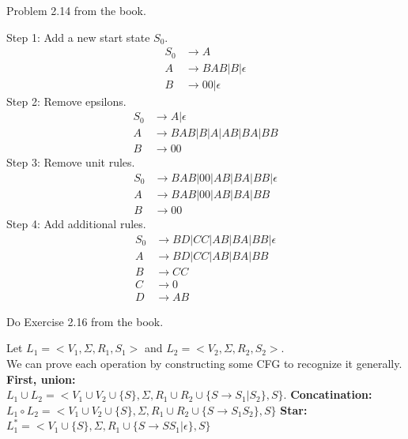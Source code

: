 \begin{problem}{4}
  Problem 2.14 from the book.
  \begin{solution}
    Step 1: Add a new start state $S_0$.
    \begin{align*}
      S_0 &\rightarrow A \\
      A &\rightarrow BAB|B|\epsilon \\
      B &\rightarrow 00|\epsilon
    \end{align*}
    Step 2: Remove epsilons.
    \begin{align*}
      S_0 &\rightarrow A | \epsilon \\
      A &\rightarrow BAB|B|A|AB|BA|BB \\
      B &\rightarrow 00
    \end{align*}
    Step 3: Remove unit rules.
    \begin{align*}
      S_0 &\rightarrow BAB|00|AB|BA|BB| \epsilon \\
      A &\rightarrow BAB|00|AB|BA|BB \\
      B &\rightarrow 00
    \end{align*}
    Step 4: Add additional rules.
    \begin{align*}
      S_0 &\rightarrow BD|CC|AB|BA|BB| \epsilon \\
      A &\rightarrow BD|CC|AB|BA|BB \\
      B &\rightarrow CC \\
      C &\rightarrow 0 \\
      D &\rightarrow AB
    \end{align*}
  \end{solution}
\end{problem}

\begin{problem}{5}
  Do Exercise 2.16 from the book.
  \begin{solution}
    Let $L_1 = <V_1, \Sigma, R_1, S_1>$ and $L_2 = <V_2, \Sigma, R_2, S_2>$. \\ We can prove each operation by
    constructing some CFG to recognize it generally.
    \br
    \textbf{First, union:} \\ $L_1 \cup L_2 = < V_1 \cup V_2 \cup \{S\}, \Sigma,
    R_1 \cup R_2 \cup \{ S \rightarrow S_1|S_2 \}, S \}$.
    \br
    \textbf{Concatination:} \\
    $L_1 \circ L_2 = < V_1 \cup V_2 \cup \{S\}, \Sigma, R_1 \cup R_2 \cup \{ S \rightarrow S_1S_2 \}, S \}$
    \br
    \textbf{Star:} \\
    $L_1^* = < V_1 \cup \{S\}, \Sigma, R_1 \cup \{ S \rightarrow SS_1|\epsilon \}, S \}$
  \end{solution}
\end{problem}

